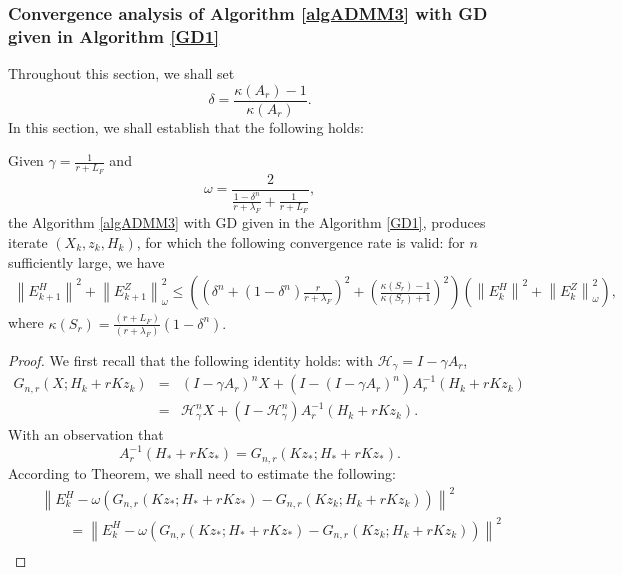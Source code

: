 \begin{itemize}
\subsubsection{Convergence analysis of Algorithm \ref{algADMM3} with GD given in Algorithm \ref{GD1}}
Throughout this section, we shall set 
\begin{equation}
\delta = \frac{\kappa(A_r)-1}{\kappa(A_r)}. 
\end{equation} 
In this section, we shall establish that the following holds: 
\begin{theorem}\label{main:theorem04} 
Given $\gamma = \frac{1}{r + L_F}$ and \begin{equation}
\omega = \frac{2}{\frac{1 - \delta^n}{r + \lambda_F} + \frac{1}{r+L_F}}, 
\end{equation}
the Algorithm \ref{algADMM3} with GD given in the Algorithm \ref{GD1}, produces iterate $(X_k, z_k, H_k)$, for which the following convergence rate is valid: for $n$ sufficiently large, we have 
\begin{eqnarray*}
\left \|E_{k+1}^H \right \|^2 + \left \|E_{k+1}^Z \right \|_\omega^2 \leq \left ( \left ( \delta^n + (1 - \delta^n) \frac{r}{r+\lambda_F} \right )^2  + \left ( \frac{\kappa(S_r) - 1}{\kappa(S_r) + 1} \right )^2 \right ) \left (\left \|E_{k}^H \right \|^2 + \left \|E_{k}^Z \right \|_\omega^2 \right ), 
\end{eqnarray*}
where $\kappa(S_r) = \frac{(r+L_F)}{(r+\lambda_F)}(1 - \delta^n).$ 
\end{theorem}
\begin{proof} 
We first recall that the following identity holds: with $\mathcal{H}_\gamma = I - \gamma A_r$, 
\begin{eqnarray*}
G_{n,r}(X;H_k + rKz_k) &=& (I - \gamma A_r)^n X + (I - (I - \gamma A_r)^n) A_r^{-1} (H_k + rKz_k) \\
&=& \mathcal{H}_\gamma^n X + (I - \mathcal{H}_\gamma^n) A_r^{-1} (H_k + rKz_k). 
\end{eqnarray*} 
With an observation that 
\begin{equation}
A_r^{-1}(H_* + rKz_*) = G_{n,r}(Kz_*;H_* + rKz_*).  
\end{equation}
According to Theorem, we shall need to estimate the following: 
\begin{eqnarray*}
&& \left \|E_k^H - \omega (G_{n,r}(Kz_*; H_*+rKz_*) - G_{n,r} (Kz_k; H_k+rKz_k)) \right \|^2 \\
&& \qquad =  \left \|E_k^H - \omega (G_{n,r}(Kz_*;H_*+rKz_*) - G_{n,r} (Kz_k; H_k+rKz_k)) \right \|^2 \\

\end{eqnarray*}
\end{proof}
\end{itemize}
